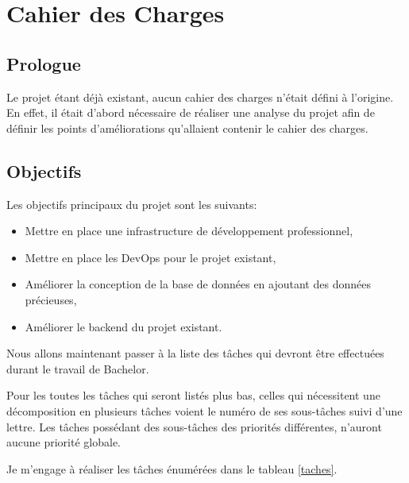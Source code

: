 \documentclass[
    iai, %
    il, %
]{heig-tb}
\begin{document}
\section{Cahier des Charges}

\subsection{Prologue}

Le projet étant déjà existant, aucun cahier des charges n'était défini à l'origine. En effet, il était d'abord nécessaire de réaliser une analyse du projet afin de définir les points d'améliorations qu'allaient contenir le cahier des charges.

\subsection{Objectifs \label{objectifs}}

Les objectifs principaux du projet sont les suivants:
\begin{itemize}
    \item Mettre en place une infrastructure de développement professionnel,
    \item Mettre en place les DevOps pour le projet existant,
    \item Améliorer la conception de la base de données en ajoutant des données précieuses,
    \item Améliorer le backend du projet existant.
\end{itemize}

\newpage
Nous allons maintenant passer à la liste des tâches qui devront être effectuées durant le travail de Bachelor.

Pour les toutes les tâches qui seront listés plus bas, celles qui nécessitent une décomposition en plusieurs tâches voient le numéro de ses sous-tâches suivi d'une lettre. Les tâches possédant des sous-tâches des priorités différentes, n'auront aucune priorité globale.

Je m'engage à réaliser les tâches énumérées dans le tableau \ref{taches}.
\end{document}
